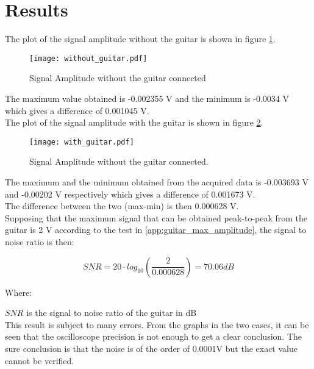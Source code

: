 \section{Results}

The plot of the signal amplitude without the guitar is shown in figure \ref{fig:without_guitar}. \\

\begin{figure}[hbt]
  \centering
  \texttt{[image: without\_guitar.pdf]}
  \caption{Signal Amplitude without the guitar connected}
  \label{fig:without_guitar}
\end{figure}

The maximum value obtained is -0.002355 V and the minimum is -0.0034 V which gives a difference of 0.001045 V. \\

The plot of the signal amplitude with the guitar is shown in figure \ref{fig:with_guitar}. \\

\begin{figure}[hbt]
  \centering
  \texttt{[image: with\_guitar.pdf]}
  \caption{Signal Amplitude without the guitar connected.}
  \label{fig:with_guitar}
\end{figure}

The maximum and the minimum obtained from the acquired data is -0.003693 V and -0.00202 V respectively which gives a difference of 0.001673 V.  \\
The difference between the two (max-min) is then 0.000628 V. \\
Supposing that the maximum signal that can be obtained peak-to-peak from the guitar is 2 V according to the test in \autoref{app:guitar_max_amplitude}, the signal to noise ratio is then:

\begin{equation}
	SNR = 20 \cdot log_{10}\left(\frac{2}{0.000628}\right) = 70.06dB
	\end{equation}

Where:

$SNR$ is the signal to noise ratio of the guitar in dB \\


This result is subject to many errors. From the graphs in the two cases, it can be seen that the oscilloscope precision is not enough to get a clear conclusion. The sure conclusion is that the noise is of the order of 0.0001V but the exact value cannot be verified.